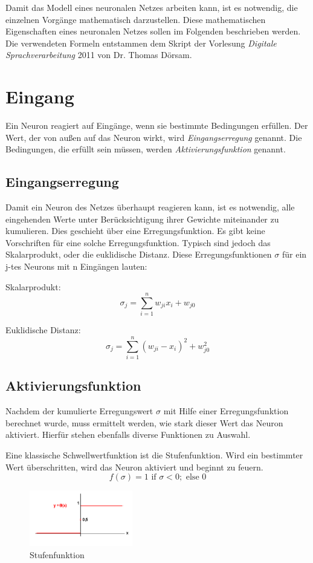 Damit das Modell eines neuronalen Netzes arbeiten kann, ist es notwendig, die einzelnen Vorgänge mathematisch darzustellen. Diese mathematischen Eigenschaften eines neuronalen Netzes sollen im Folgenden beschrieben werden. Die verwendeten Formeln entstammen dem Skript der Vorlesung \emph{Digitale Sprachverarbeitung} 2011 von Dr. Thomas Dörsam.

\section{Eingang}
Ein Neuron reagiert auf Eingänge, wenn sie bestimmte Bedingungen erfüllen. Der Wert, der von außen auf das Neuron wirkt, wird \emph{Eingangserregung} genannt. Die Bedingungen, die erfüllt sein müssen, werden \emph{Aktivierungsfunktion} genannt.

\subsection{Eingangserregung}
Damit ein Neuron des Netzes überhaupt reagieren kann, ist es notwendig, alle eingehenden Werte unter Berücksichtigung ihrer Gewichte miteinander zu kumulieren. Dies geschieht über eine Erregungsfunktion. Es gibt keine Vorschriften für eine solche Erregungsfunktion. Typisch sind jedoch das Skalarprodukt, oder die euklidische Distanz. Diese Erregungsfunktionen $\sigma$ für ein j-tes Neurons mit n Eingängen lauten:

Skalarprodukt:
\begin{equation}
  \sigma_{j} = \sum_{i=1}^{n} w_{ji} x_{i}+w_{j0}
\end{equation} 

Euklidische Distanz:
\begin{equation}
  \sigma_{j} = \sum_{i=1}^{n} (w_{ji} - x_{i})^2+w_{j0}^2
\end{equation} 

\subsection{Aktivierungsfunktion}
Nachdem der kumulierte Erregungswert $\sigma$ mit Hilfe einer Erregungsfunktion berechnet wurde, muss ermittelt werden, wie stark dieser Wert das Neuron aktiviert. Hierfür stehen ebenfalls diverse Funktionen zu Auswahl.

Eine klassische Schwellwertfunktion ist die Stufenfunktion. Wird ein bestimmter Wert überschritten, wird das Neuron aktiviert und beginnt zu feuern.
\begin{equation}
f(\sigma) = 1 \mbox{ if } \sigma < 0;  \mbox{ else } 0
\end{equation}
\begin{figure}[h]
\centering
\includegraphics[width=0.4\textwidth]{pictures/stufenfunktion.png}
\caption{Stufenfunktion \cite{bib:stufe}}
\end{figure}

